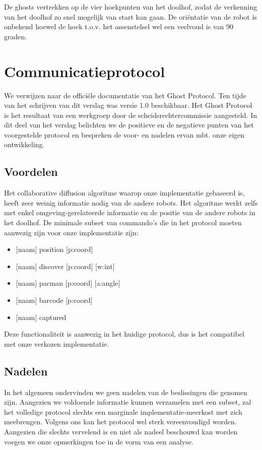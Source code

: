 \documentclass[12pt,a4paper]{report}
\begin{document}
De ghosts vertrekken op de vier hoekpunten van het doolhof, zodat de verkenning van het doolhof zo snel mogelijk van start kan gaan. De ori\"entatie van de robot is onbekend hoewel de hoek t.o.v. het assenstelsel wel een veelvoud is van 90 graden.


\section{Communicatieprotocol}

We verwijzen naar de offici\"ele documentatie van het Ghost Protocol. Ten tijde van het schrijven van dit verslag was versie 1.0 beschikbaar. Het Ghost Protocol is het resultaat van een werkgroep door de scheidsrechtercommissie aangesteld. In dit deel van het verslag belichten we de positieve en de negatieve punten van het voorgestelde protocol en bespreken de voor- en nadelen ervan mbt. onze eigen ontwikkeling.

\subsection{Voordelen}

Het collaborative diffusion algoritme waarop onze implementatie gebaseerd is, heeft zeer weinig informatie nodig van de andere robots. Het algoritme werkt zelfs met enkel omgeving-gerelateerde informatie en de positie van de andere robots in het doolhof. De minimale subset van commando's die in het protocol moeten aanwezig zijn voor onze implementatie zijn:

\begin{itemize}
	\item{ [naam] position [p:coord]}
	\item{ [naam] discover [p:coord] [w:int]}
	\item{ [naam] pacman [p:coord] [a:angle]}
	\item{ [naam] barcode [p:coord] }
	\item{ [naam] captured }
\end{itemize}

Deze functionaliteit is aanwezig in het huidige protocol, dus is het compatibel met onze verkozen implementatie.

\subsection{Nadelen}

In het algemeen ondervinden we geen nadelen van de beslissingen die genomen zijn. Aangezien we voldoende informatie kunnen verzamelen met een subset, zal het volledige protocol slechts een marginale implementatie-meerkost met zich meebrengen. Volgens ons kan het protocol wel sterk vereenvoudigd worden. Aangezien die slechts vervelend is en niet als nadeel beschouwd kan worden voegen we onze opmerkingen toe in de vorm van een analyse.
\end{document}

